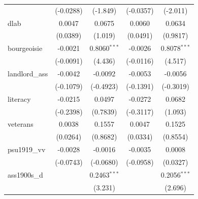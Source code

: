 \begin{table}[htbp]
\begin{tabular}{lcccc}
                                       & (-0.0288)             & (-1.849)                      & (-0.0357)            & (-2.011)\\   
      dlab                             & 0.0047                & 0.0675                        & 0.0060               & 0.0634\\   
                                       & (0.0389)              & (1.019)                       & (0.0491)             & (0.9817)\\   
      bourgeoisie                      & -0.0021               & 0.8060$^{***}$                & -0.0026              & 0.8078$^{***}$\\   
                                       & (-0.0091)             & (4.436)                       & (-0.0116)            & (4.517)\\   
      landlord\_ass                    & -0.0042               & -0.0092                       & -0.0053              & -0.0056\\   
                                       & (-0.1079)             & (-0.4923)                     & (-0.1391)            & (-0.3019)\\   
      literacy                         & -0.0215               & 0.0497                        & -0.0272              & 0.0682\\   
                                       & (-0.2398)             & (0.7839)                      & (-0.3117)            & (1.093)\\   
      veterans                         & 0.0038                & 0.1557                        & 0.0047               & 0.1525\\   
                                       & (0.0264)              & (0.8682)                      & (0.0334)             & (0.8554)\\   
      psu1919\_vv                      & -0.0028               & -0.0016                       & -0.0035              & 0.0008\\   
                                       & (-0.0743)             & (-0.0680)                     & (-0.0958)            & (0.0327)\\   
      ass1900s\_d                      &                       & 0.2463$^{***}$                &                      & 0.2056$^{***}$\\   
                                       &                       & (3.231)                       &                      & (2.696)\\   

\end{tabular}
\end{table}
